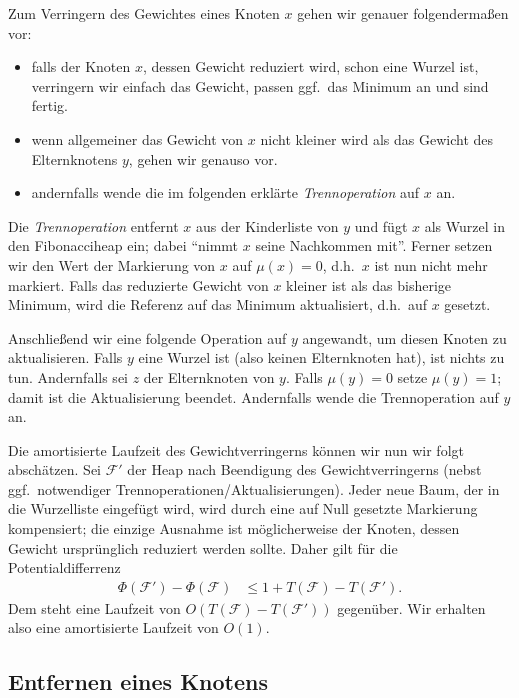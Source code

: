 \documentclass[10pt,reqno]{amsart}
\numberwithin{equation}{section}
\newcommand\cF{\mathcal F}
\begin{document}
Zum Verringern des Gewichtes eines Knoten $x$ gehen wir genauer folgenderma\ss en vor:
			\begin{itemize}
				\item falls der Knoten $x$, dessen Gewicht reduziert wird, schon eine Wurzel ist, verringern wir einfach das Gewicht, passen ggf.\ das Minimum an und sind fertig.
				\item wenn allgemeiner das Gewicht von $x$ nicht kleiner wird als das Gewicht des Elternknotens $y$, gehen wir genauso vor.
				\item andernfalls wende die im folgenden erkl\"arte {\em Trennoperation} auf $x$ an.
			\end{itemize}

			Die {\em Trennoperation} entfernt $x$ aus der Kinderliste von $y$ und f\"ugt $x$ als Wurzel in den Fibonacciheap ein; dabei ``nimmt $x$ seine Nachkommen mit''.
			Ferner setzen wir den Wert der Markierung von $x$ auf $\mu(x)=0$, d.h.\ $x$ ist nun nicht mehr markiert.
Falls das reduzierte Gewicht von $x$ kleiner ist als das bisherige Minimum, wird die Referenz auf das Minimum aktualisiert, d.h.\ auf $x$ gesetzt.

Anschlie\ss end wir eine folgende Operation auf $y$ angewandt, um diesen Knoten zu aktualisieren.
Falls $y$ eine Wurzel ist (also keinen Elternknoten hat), ist nichts zu tun.
Andernfalls sei $z$ der Elternknoten von $y$.
Falls $\mu(y)=0$ setze $\mu(y)=1$; damit ist die Aktualisierung beendet.
Andernfalls wende die Trennoperation auf $y$ an.

Die amortisierte Laufzeit des Gewichtverringerns k\"onnen wir nun wir folgt absch\"atzen.
Sei $\cF'$ der Heap nach Beendigung des Gewichtverringerns (nebst ggf.\ notwendiger Trennoperationen/Aktualisierungen).
Jeder neue Baum, der in die Wurzelliste eingef\"ugt wird, wird durch eine auf Null gesetzte Markierung kompensiert; die einzige Ausnahme ist m\"oglicherweise der Knoten, dessen Gewicht urspr\"unglich reduziert werden sollte.
Daher gilt f\"ur die Potentialdifferrenz
\begin{align}\label{eq_fibo_reduce}
	\Phi(\cF')-\Phi(\cF)&\leq 1+T(\cF)-T(\cF').
\end{align}
Dem steht eine Laufzeit von $O(T(\cF)-T(\cF'))$ gegen\"uber.
Wir erhalten also eine amortisierte Laufzeit von $O(1)$.


\subsection{Entfernen eines Knotens}\label{sec_fibo_remove}
\end{document}
